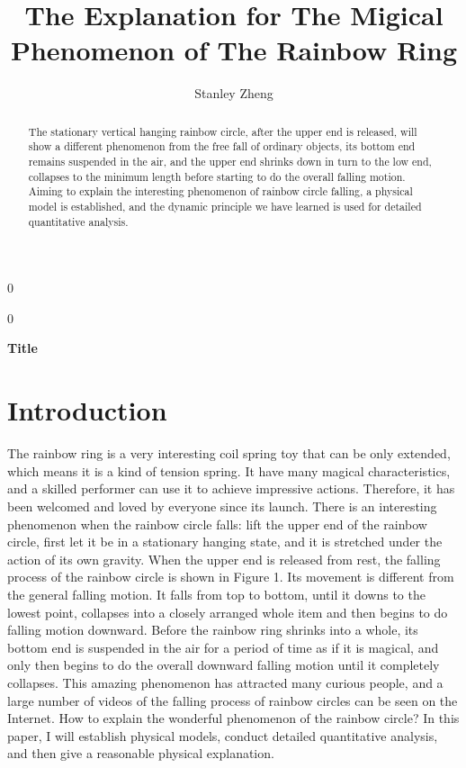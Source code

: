 \documentclass[12pt]{article}
\newcommand{\blind}{0}
\begin{document}

%

\def\spacingset#1{\renewcommand{\baselinestretch}%
{#1}\small\normalsize} \spacingset{1}



\blind
{
  \title{\bf The Explanation for The Migical Phenomenon of The Rainbow Ring}
  \author{Stanley Zheng}
  \maketitle
} \fi

\blind
{
  \bigskip
  \bigskip
  \bigskip
  \begin{center}
    {\LARGE\bf Title}
\end{center}
  \medskip
} \fi

\bigskip
\begin{abstract}
The stationary vertical hanging rainbow circle, after the upper end is released, will show a different phenomenon from the free fall of ordinary objects, its bottom end remains suspended in the air, and the upper end shrinks down in turn to the low end, collapses to the minimum length before starting to do the overall falling motion. Aiming to explain the interesting phenomenon of rainbow circle falling, a physical model is established, and the dynamic principle we have learned is used for detailed quantitative analysis.
\end{abstract}


\spacingset{1.45}
\section*{Introduction}
\label{sec:intro}

The rainbow ring is a very interesting coil spring toy that can be only extended, which means it is a kind of tension spring. It have many magical characteristics, and a skilled performer can use it to achieve impressive actions. Therefore, it has been welcomed and loved by everyone since its launch. There is an interesting phenomenon when the rainbow circle falls: lift the upper end of the rainbow circle, first let it be in a stationary hanging state, and it is stretched under the action of its own gravity. When the upper end is released from rest, the falling process of the rainbow circle is shown in Figure 1. Its movement is different from the general falling motion. It falls from top to bottom, until it downs to the lowest point, collapses into a closely arranged whole item and then begins to do falling motion downward. Before the rainbow ring shrinks into a whole, its bottom end is suspended in the air for a period of time as if it is magical, and only then begins to do the overall downward falling motion until it completely collapses. This amazing phenomenon has attracted many curious people, and a large number of videos of the falling process of rainbow circles can be seen on the Internet. How to explain the wonderful phenomenon of the rainbow circle? In this paper, I will establish physical models, conduct detailed quantitative analysis, and then give a reasonable physical explanation.
\end{document}
